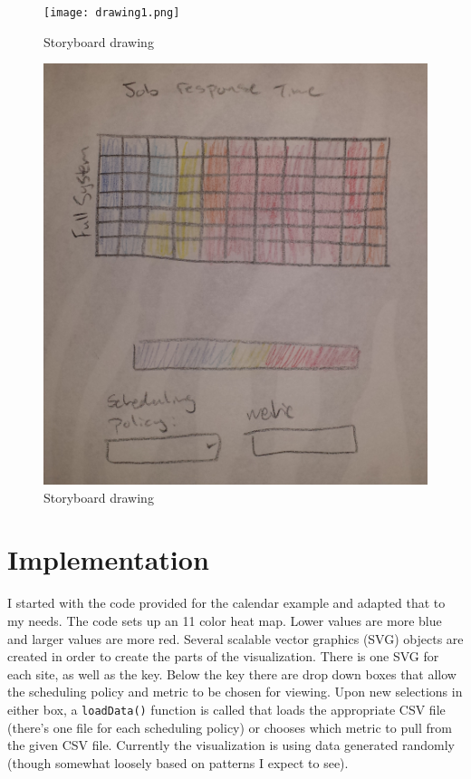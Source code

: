 \documentclass[11pt]{article}
\numberwithin{figure}{section}
\begin{document}
\begin{figure}[ht]
\centering
	\texttt{[image: drawing1.png]}
\caption{Storyboard drawing}
\label{fig:drawing1}
\end{figure}

\begin{figure}[ht]
\centering
	\includegraphics[width=6in]{drawing2.png}
\caption{Storyboard drawing}
\label{fig:drawing2}
\end{figure}

\section{Implementation}
I started with the code provided for the calendar example and adapted that to my needs.  The code sets up an 11 color heat map.  Lower values are more blue and larger values are more red.  Several scalable vector graphics (SVG) objects are created in order to create the parts of the visualization.  There is one SVG for each site, as well as the key.  Below the key there are drop down boxes that allow the scheduling policy and metric to be chosen for viewing.  Upon new selections in either box, a \texttt{loadData()} function is called that loads the appropriate CSV file (there's one file for each scheduling policy) or chooses which metric to pull from the given CSV file.  Currently the visualization is using data generated randomly (though somewhat loosely based on patterns I expect to see).  
\end{document}
